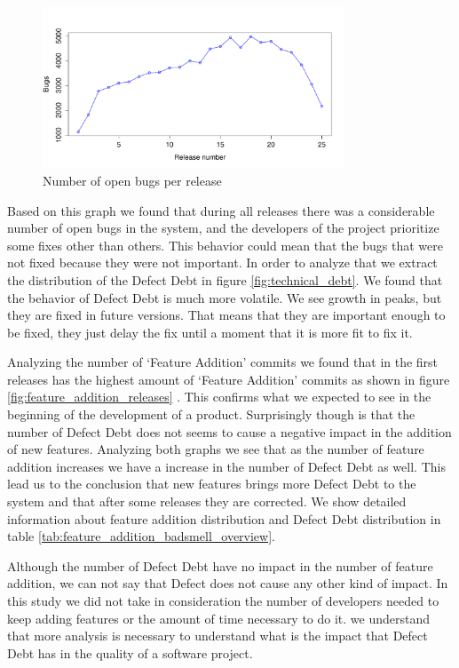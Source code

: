 \begin{figure}[thb!]
	\caption{Number of open bugs per release}
	\label{fig:number_of_bugs_releases}
	\includegraphics[width=90mm,scale=0.5]{figures/number_of_bugs_releases}
\end{figure}
  
Based on this graph we found that during all releases there was a considerable number of open bugs in the system, and the developers of the project prioritize some fixes other than others. This behavior could mean that the bugs that were not fixed because they were not important. In order to analyze that we extract the distribution of the Defect Debt in figure \ref{fig:technical_debt}. We found that the behavior of Defect Debt is much more volatile. We see growth in peaks, but they are fixed in future versions. That means that they are important enough to be fixed, they just delay the fix until a moment that it is more fit to fix it.

Analyzing the number of `Feature Addition' commits we found that in the first releases has the highest amount of `Feature Addition' commits as shown in figure \ref{fig:feature_addition_releases} . This confirms what we expected to see in the beginning of the development of a product. Surprisingly though is that the number of Defect Debt does not seems to cause a negative impact in the addition of new features. Analyzing both graphs we see that as the number of feature addition increases we have a increase in the number of Defect Debt as well. This lead us to the conclusion that new features brings more Defect Debt to the system and that after some releases they are corrected. We show detailed information about feature addition distribution and Defect Debt distribution in table \ref{tab:feature_addition_badsmell_overview}.

Although the number of Defect Debt have no impact in the number of feature addition, we can not say that Defect does not cause any other kind of impact. In this study we did not take in consideration the number of developers needed to keep adding features or the amount of time necessary to do it. we understand that more analysis is necessary to understand what is the impact that Defect Debt has in the quality of a software project.

